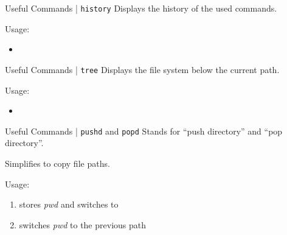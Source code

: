 \documentclass{setbeamer}
\begin{document}
\begin{frame}{Useful Commands | \texttt{history}}
    Displays the history of the used commands.

    \vspace{0.3cm}

    Usage:
    \begin{itemize}
        \item {}
    \end{itemize}
\end{frame}

\begin{frame}{Useful Commands | \texttt{tree}}
    Displays the file system below the current path.

    \vspace{0.3cm}

    Usage:
    \begin{itemize}
        \item {}
    \end{itemize}
\end{frame}

\begin{frame}{Useful Commands | \texttt{pushd} and \texttt{popd}}
    Stands for ``push directory'' and ``pop directory''.

    \vspace{0.3cm}

    Simplifies to copy file paths.

    \vspace{0.3cm}

    Usage:
    \begin{enumerate}
        \item {}\textemdash stores \emph{pwd} and switches to 
        \item {}\textemdash switches \emph{pwd} to the previous path
    \end{enumerate}
\end{frame}
\end{document}
